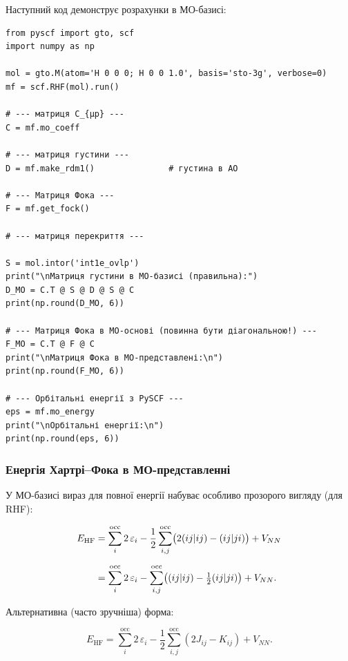Наступний код демонструє розрахунки в МО-базисі:
\begin{verbatim}
from pyscf import gto, scf
import numpy as np

mol = gto.M(atom='H 0 0 0; H 0 0 1.0', basis='sto-3g', verbose=0)
mf = scf.RHF(mol).run()

# --- матриця C_{μp} ---
C = mf.mo_coeff

# --- матриця густини ---
D = mf.make_rdm1()               # густина в АО

# --- Матриця Фока ---
F = mf.get_fock()

# --- матриця перекриття ---

S = mol.intor('int1e_ovlp')
print("\nМатриця густини в МО-базисі (правильна):")
D_MO = C.T @ S @ D @ S @ C
print(np.round(D_MO, 6))

# --- Матриця Фока в МО-основі (повинна бути діагональною!) ---
F_MO = C.T @ F @ C
print("\nМатриця Фока в МО-представлені:\n")
print(np.round(F_MO, 6))

# --- Орбітальні енергії з PySCF ---
eps = mf.mo_energy
print("\nОрбітальні енергії:\n")
print(np.round(eps, 6))
\end{verbatim}
\subsubsection{Енергія Хартрі–Фока в МО-представленні}

У МО-базисі вираз для повної енергії набуває особливо прозорого вигляду (для RHF):

\begin{align}\label{eq:E_HF_MO_explicit}
    E_{\mathrm{HF}}
    &= \sum_{i}^{\text{occ}} 2\,\varepsilon_i
       - \frac{1}{2} \sum_{i,j}^{\text{occ}} \bigl(2(ij|ij) - (ij|ji)\bigr)
       + V_{NN} \notag \\[6pt]
    &= \sum_{i}^{\text{occ}} 2\,\varepsilon_i
       - \sum_{i,j}^{\text{occ}} \bigl((ij|ij) - \tfrac{1}{2}(ij|ji)\bigr)
       + V_{NN}.
\end{align}

Альтернативна (часто зручніша) форма:

\begin{equation}
    E_{\mathrm{HF}}
    = \sum_{i}^{\text{occ}} 2\,\varepsilon_i
      - \frac{1}{2} \sum_{i,j}^{\text{occ}} (2J_{ij} - K_{ij})
      + V_{NN}.
\end{equation}

